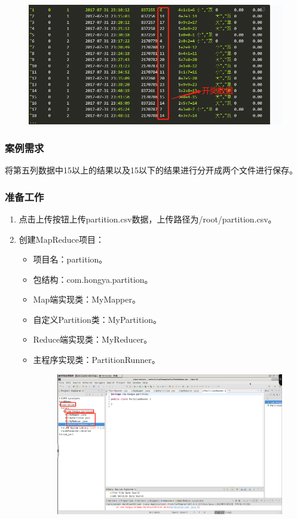 \documentclass {article}
\begin{document}
				\begin{figure}[H]
					\centering
					\includegraphics[width=4.5in]{figures/fig8.jpg}
				\end{figure}
		
			\subsubsection{案例需求}
				将第五列数据中15以上的结果以及15以下的结果进行分开成两个文件进行保存。
			
			\subsubsection{准备工作}
				\begin{enumerate}
					\item 点击上传按钮上传partition.csv数据，上传路径为/root/partition.csv。
					\item 创建MapReduce项目：
					\begin{itemize}
						\item 项目名：partition。
						\item 包结构：com.hongya.partition。
						\item Map端实现类：MyMapper。
						\item 自定义Partition类：MyPartition。
						\item Reduce端实现类：MyReducer。
						\item 主程序实现类：PartitionRunner。
						\begin{figure}[H]
							\centering
							\includegraphics[width=4.5in]{figures/fig9.png}
						\end{figure}
					\end{itemize}
				\end{enumerate}
				
\end{document}
